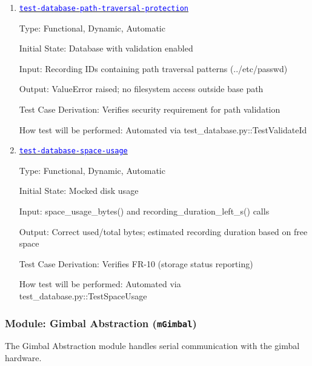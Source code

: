 \documentclass[12pt, titlepage]{article}
\newcommand{\mref}[1]{\texttt{#1}}
\newcommand{\tid}[1]{\hyperlink{tid:#1}{\textcolor{blue}{\texttt{#1}}}}
\begin{document}
\begin{enumerate}
        Test Case Derivation: Verifies FR-12 (recording renaming and deletion)

        How test will be performed: Automated via
        test\_database.py::TestRenameRecording, TestDeleteRecording

  \item{\tid{test-database-path-traversal-protection}\\}

        Type: Functional, Dynamic, Automatic

        Initial State: Database with validation enabled

        Input: Recording IDs containing path traversal patterns (../etc/passwd)

        Output: ValueError raised; no filesystem access outside base path

        Test Case Derivation: Verifies security requirement for path validation

        How test will be performed: Automated via test\_database.py::TestValidateId

  \item{\tid{test-database-space-usage}\\}

        Type: Functional, Dynamic, Automatic

        Initial State: Mocked disk usage

        Input: space\_usage\_bytes() and recording\_duration\_left\_s() calls

        Output: Correct used/total bytes; estimated recording duration based on free
        space

        Test Case Derivation: Verifies FR-10 (storage status reporting)

        How test will be performed: Automated via test\_database.py::TestSpaceUsage

\end{enumerate}

\subsubsection{Module: Gimbal Abstraction (\mref{mGimbal})}

The Gimbal Abstraction module handles serial communication with the gimbal
hardware.
\end{document}
